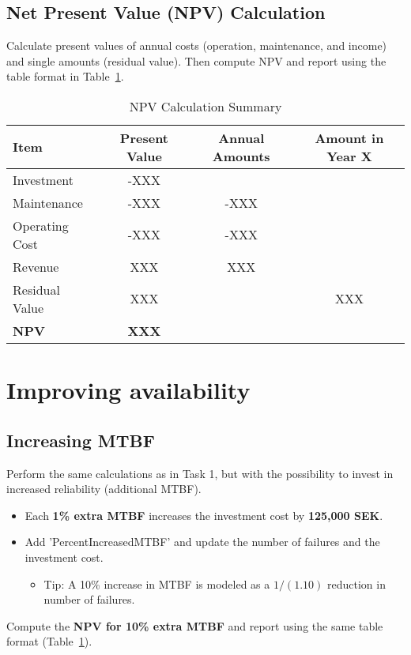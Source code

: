 \documentclass[a4paper,12pt]{exam}
\begin{document}
\subsection{Net Present Value (NPV) Calculation}
Calculate present values of annual costs (operation, maintenance, and income) and single amounts (residual value). Then compute NPV and report using the table format in Table~\ref{NPVtable}.

\begin{table}[h]
    \centering
    \begin{tabular}{lccc}
        \toprule
        \textbf{Item} & \textbf{Present Value} & \textbf{Annual Amounts} & \textbf{Amount in Year X} \\
        \midrule
        Investment & -XXX &  &  \\
        Maintenance & -XXX & -XXX &  \\
        Operating Cost & -XXX & -XXX &  \\
        Revenue & XXX & XXX &  \\
        Residual Value & XXX &  & XXX \\
        \textbf{NPV} & \textbf{XXX} &  &  \\
        \bottomrule
    \end{tabular}
    \caption{NPV Calculation Summary}
    \label{NPVtable}
\end{table}

\section{Improving availability}
\subsection{Increasing MTBF}
Perform the same calculations as in Task 1, but with the possibility to invest in increased reliability (additional MTBF). 
\begin{itemize}
    \item Each \textbf{1\% extra MTBF} increases the investment cost by \textbf{125,000 SEK}.     
    \item Add 'PercentIncreasedMTBF' and update the number of failures and the investment cost.
    \begin{itemize}
        \item Tip: A 10\% increase in MTBF is modeled as a $1/(1.10)$ reduction in number of failures.
    \end{itemize}
\end{itemize}
Compute the \textbf{NPV for 10\% extra MTBF} and report using the same table format (Table~\ref{NPVtable}).
\end{document}
